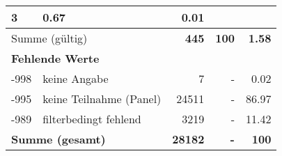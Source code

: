 \begin{longtable}{lXrrr}
       \num{3} &
       \num[round-mode=places,round-precision=2]{0.67} &
         \num[round-mode=places,round-precision=2]{0.01} \\
     \midrule
     \multicolumn{2}{l}{Summe (gültig)} &
       \textbf{\num{445}} &
     \textbf{\num{100}} &
       \textbf{\num[round-mode=places,round-precision=2]{1.58}} \\
     \multicolumn{5}{l}{\textbf{Fehlende Werte}}\\
       -998 &
       keine Angabe &
         \num{7} &
        - &
         \num[round-mode=places,round-precision=2]{0.02} \\
       -995 &
       keine Teilnahme (Panel) &
         \num{24511} &
        - &
         \num[round-mode=places,round-precision=2]{86.97} \\
       -989 &
       filterbedingt fehlend &
         \num{3219} &
        - &
         \num[round-mode=places,round-precision=2]{11.42} \\
     \midrule
     \multicolumn{2}{l}{\textbf{Summe (gesamt)}} &
          \textbf{\num{28182}} &
        \textbf{-} &
        \textbf{\num{100}} \\
     \bottomrule
     \end{longtable}
     
